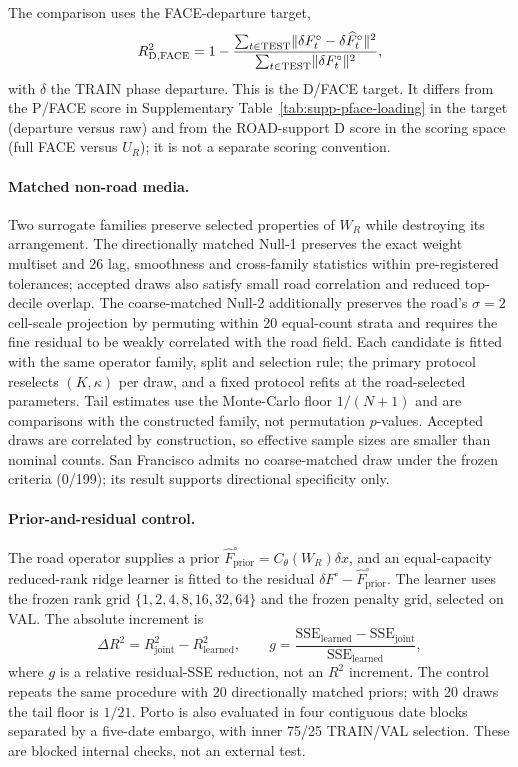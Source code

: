 The comparison uses the FACE-departure target,
\begin{equation}
 R^2_{\mathrm{D,FACE}}=1-
 \frac{\sum_{t\in\mathrm{TEST}}\lVert \delta F_t^\circ-\delta\widehat F_t^\circ \rVert^2}
 {\sum_{t\in\mathrm{TEST}}\lVert \delta F_t^\circ \rVert^2},
 \label{eq:supp-facedep}
\end{equation}
with $\delta$ the TRAIN phase departure. This is the D/FACE target. It differs from the P/FACE score in Supplementary Table~\ref{tab:supp-pface-loading} in the target (departure versus raw) and from the ROAD-support D score in the scoring space (full FACE versus \(U_R\)); it is not a separate scoring convention.

\paragraph{Matched non-road media.} Two surrogate families preserve selected properties of $W_R$ while destroying its arrangement. The directionally matched Null-1 preserves the exact weight multiset and 26 lag, smoothness and cross-family statistics within pre-registered tolerances; accepted draws also satisfy small road correlation and reduced top-decile overlap. The coarse-matched Null-2 additionally preserves the road's $\sigma=2$ cell-scale projection by permuting within 20 equal-count strata and requires the fine residual to be weakly correlated with the road field. Each candidate is fitted with the same operator family, split and selection rule; the primary protocol reselects $(K,\kappa)$ per draw, and a fixed protocol refits at the road-selected parameters. Tail estimates use the Monte-Carlo floor $1/(N+1)$ and are comparisons with the constructed family, not permutation $p$-values. Accepted draws are correlated by construction, so effective sample sizes are smaller than nominal counts. San Francisco admits no coarse-matched draw under the frozen criteria (0/199); its result supports directional specificity only.

\paragraph{Prior-and-residual control.} The road operator supplies a prior
$\widehat F^\circ_{\mathrm{prior}}=C_\theta(W_R)\delta x$, and an equal-capacity reduced-rank ridge learner is fitted to the residual $\delta F^\circ-\widehat F^\circ_{\mathrm{prior}}$. The learner uses the frozen rank grid $\{1,2,4,8,16,32,64\}$ and the frozen penalty grid, selected on VAL. The absolute increment is
\begin{equation}
 \Delta R^2=R^2_{\mathrm{joint}}-R^2_{\mathrm{learned}},
 \qquad
 g=\frac{\mathrm{SSE}_{\mathrm{learned}}-\mathrm{SSE}_{\mathrm{joint}}}
 {\mathrm{SSE}_{\mathrm{learned}}},
 \label{eq:supp-priorgain}
\end{equation}
where $g$ is a relative residual-SSE reduction, not an $R^2$ increment. The control repeats the same procedure with 20 directionally matched priors; with 20 draws the tail floor is $1/21$. Porto is also evaluated in four contiguous date blocks separated by a five-date embargo, with inner 75/25 TRAIN/VAL selection. These are blocked internal checks, not an external test.
